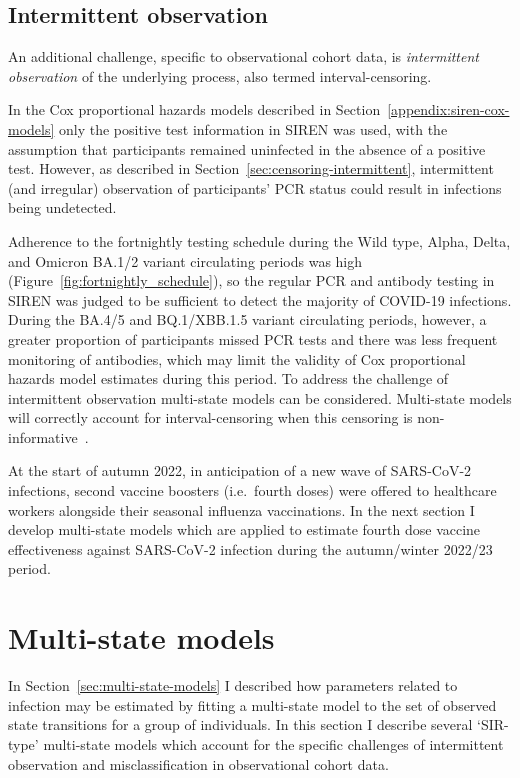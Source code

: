 \subsection{Intermittent observation}

An additional challenge, specific to observational cohort data, is \textit{intermittent observation} of the underlying process, also termed interval-censoring.

In the Cox proportional hazards models described in Section~\ref{appendix:siren-cox-models} only the positive test information in SIREN was used, with the assumption that participants remained uninfected in the absence of a positive test. However, as described in Section~\ref{sec:censoring-intermittent}, intermittent (and irregular) observation of participants' PCR status could result in infections being undetected.

Adherence to the fortnightly testing schedule during the Wild type, Alpha, Delta, and Omicron BA.1/2 variant circulating periods was high (Figure~\ref{fig:fortnightly_schedule}), so the regular PCR and antibody testing in SIREN was judged to be sufficient to detect the majority of COVID-19 infections. During the BA.4/5 and BQ.1/XBB.1.5 variant circulating periods, however, a greater proportion of participants missed PCR tests and there was less frequent monitoring of antibodies, which may limit the validity of Cox proportional hazards model estimates during this period. To address the challenge of intermittent observation multi-state models can be considered. Multi-state models will correctly account for interval-censoring when this censoring is non-informative~\parencite{van-den-Hout2016-xy}.

At the start of autumn 2022, in anticipation of a new wave of SARS-CoV-2 infections, second vaccine boosters (i.e.\ fourth doses) were offered to healthcare workers alongside their seasonal influenza vaccinations. In the next section I develop multi-state models which are applied to estimate fourth dose vaccine effectiveness against SARS-CoV-2 infection during the autumn/winter 2022/23 period.

\section{Multi-state models}\label{sec:siren-msm}

In Section~\ref{sec:multi-state-models} I described how parameters related to infection may be estimated by fitting a multi-state model to the set of observed state transitions for a group of individuals. In this section I describe several `SIR-type' multi-state models which account for the specific challenges of intermittent observation and misclassification in observational cohort data.

